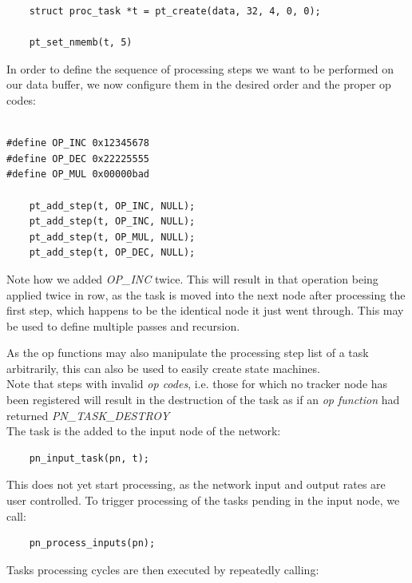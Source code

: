 \begin{lstlisting}
	struct proc_task *t = pt_create(data, 32, 4, 0, 0);

	pt_set_nmemb(t, 5)
\end{lstlisting}


\noindent In order to define the sequence of processing steps we want to be
performed on our data buffer, we now configure them in the desired order and
the proper op codes:

\begin{lstlisting}

#define OP_INC 0x12345678
#define OP_DEC 0x22225555 
#define OP_MUL 0x00000bad

	pt_add_step(t, OP_INC, NULL);
	pt_add_step(t, OP_INC, NULL);
	pt_add_step(t, OP_MUL, NULL);
	pt_add_step(t, OP_DEC, NULL);

\end{lstlisting}

\noindent
Note how we added \emph{OP\_INC} twice. This will result in that operation
being applied twice in row, as the task is moved into the next node after
processing the first step, which happens to be the identical node
it just went through. This may be used to define multiple passes and recursion.

As the op functions may also manipulate the processing step list of a task
arbitrarily, this can also be used to easily create state machines.
\\

\noindent
Note that steps with invalid \emph{op codes}, i.e. those for which no tracker
node has been registered will result in the destruction of the task as if
an \emph{op function} had returned \emph{PN\_TASK\_DESTROY}
\\

\noindent
The task is the added to the input node of the network:

\begin{lstlisting}
	pn_input_task(pn, t);
\end{lstlisting}

\noindent
This does not yet start processing, as the network input and output rates are
user controlled. To trigger processing of the tasks pending in the input node,
we call:

\begin{lstlisting}
	pn_process_inputs(pn);
\end{lstlisting}


\noindent
Tasks processing cycles are then executed by repeatedly calling:

